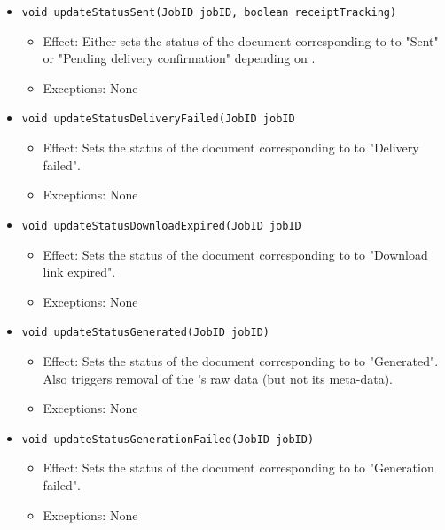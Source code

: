 \begin{itemize}
\begin{itemize}
		\item \texttt{void updateStatusSent(JobID jobID, boolean receiptTracking)}
		\begin{itemize}
            \item Effect: Either sets the status of the document corresponding to  to "Sent" or "Pending delivery confirmation" depending on .
            \item Exceptions: None
        \end{itemize}

		\item \texttt{void updateStatusDeliveryFailed(JobID jobID}
		\begin{itemize}
            \item Effect: Sets the status of the document corresponding to  to "Delivery failed".
            \item Exceptions: None
        \end{itemize}

		\item \texttt{void updateStatusDownloadExpired(JobID jobID}
		\begin{itemize}
            \item Effect: Sets the status of the document corresponding to  to "Download link expired".
            \item Exceptions: None
        \end{itemize}

		\item \texttt{void updateStatusGenerated(JobID jobID)}
		\begin{itemize}
            \item Effect: Sets the status of the document corresponding to  to "Generated". Also triggers removal of the 's raw data (but not its meta-data).
            \item Exceptions: None
        \end{itemize}

		\item \texttt{void updateStatusGenerationFailed(JobID jobID)}
		\begin{itemize}
            \item Effect: Sets the status of the document corresponding to  to "Generation failed".
            \item Exceptions: None
        \end{itemize}


\end{itemize}
\end{itemize}
